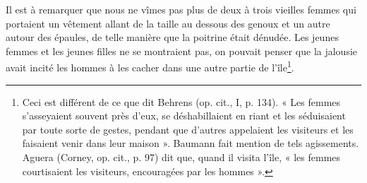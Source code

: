 \documentclass{article}
\begin{document}
        
    Il est à remarquer que nous ne vîmes pas plus de deux à trois vieilles femmes qui portaient un vêtement allant de la taille au dessous des genoux et un autre autour des épaules, de telle manière que la poitrine était dénudée. Les jeunes femmes et les jeunes filles ne se montraient pas, on pouvait penser que la jalousie avait incité les hommes à les cacher dans une autre partie de l'île\footnote{Ceci est différent de ce que dit Behrens (op. cit., I, p. 134). « Les femmes s'asseyaient souvent près d'eux, se déshabillaient en riant et les séduisaient par toute sorte de gestes, pendant que d'autres appelaient les visiteurs et les faisaient venir dans leur maison ». Baumann fait mention de tels agissements. Aguera (Corney, op. cit., p. 97) dit que, quand il visita l'île, « les femmes courtisaient les visiteurs, encouragées par les hommes ».}.
            
\end{document}
